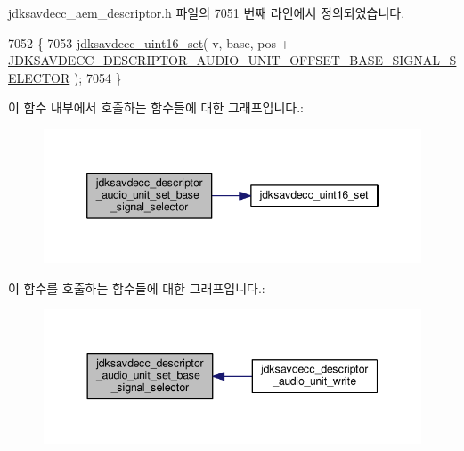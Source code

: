 jdksavdecc\+\_\+aem\+\_\+descriptor.\+h 파일의 7051 번째 라인에서 정의되었습니다.


\begin{DoxyCode}
7052 \{
7053     \hyperlink{group__endian_ga14b9eeadc05f94334096c127c955a60b}{jdksavdecc\_uint16\_set}( v, base, pos + 
      \hyperlink{group__descriptor__audio_ga83b9dd6047c4a1360160ec7109c2ed1a}{JDKSAVDECC\_DESCRIPTOR\_AUDIO\_UNIT\_OFFSET\_BASE\_SIGNAL\_SELECTOR}
       );
7054 \}
\end{DoxyCode}


이 함수 내부에서 호출하는 함수들에 대한 그래프입니다.\+:
\nopagebreak
\begin{figure}[H]
\begin{center}
\leavevmode
\includegraphics[width=346pt]{group__descriptor__audio_gadb27a83d26fbc306e1cf8c641e91c860_cgraph}
\end{center}
\end{figure}




이 함수를 호출하는 함수들에 대한 그래프입니다.\+:
\nopagebreak
\begin{figure}[H]
\begin{center}
\leavevmode
\includegraphics[width=344pt]{group__descriptor__audio_gadb27a83d26fbc306e1cf8c641e91c860_icgraph}
\end{center}
\end{figure}


